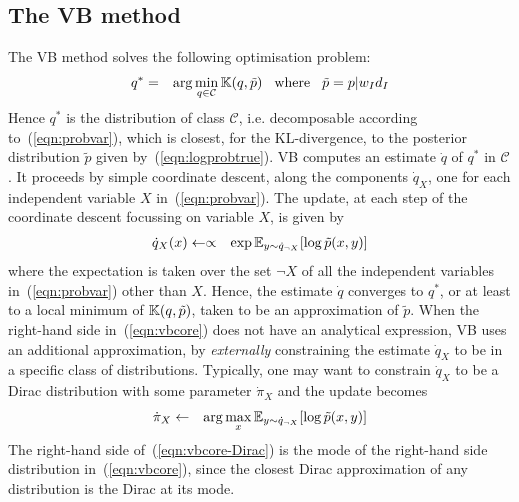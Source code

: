 \subsection{The VB method}
The VB method solves the following optimisation problem:
\begin{eqnarray}
\label{eqn:KLmin}
q^* & = & \arg\min_{q\in\mathcal{C}}\mathbb{K}(q,\tilde{p})
\hspace{.3cm}\textrm{where}\hspace{.3cm}\tilde{p}=p|w_Id_I
\end{eqnarray}
Hence $q^*$ is the distribution of class $\mathcal{C}$, i.e. decomposable according to~(\ref{eqn:probvar}), which is closest, for the KL-divergence, to the posterior distribution $\tilde{p}$ given by~(\ref{eqn:logprobtrue}). VB computes an estimate $\dot{q}$ of $q^*$ in $\mathcal{C}$. It proceeds by simple coordinate descent, along the components $\dot{q}_X$, one for each independent variable $X$ in~(\ref{eqn:probvar}). The update, at each step of the coordinate descent focussing on variable $X$, is given by
\begin{eqnarray}
\label{eqn:vbcore}
\dot{q}_X(x) &\leftarrow\propto& \exp\mathbb{E}_{y\sim \dot{q}_{\neg X}}[\log\tilde{p}(x,y)]
\end{eqnarray}
where the expectation is taken over the set $\neg X$ of all the independent variables in~(\ref{eqn:probvar}) other than $X$. Hence, the estimate $\dot{q}$ converges to $q^*$, or at least to a local minimum of $\mathbb{K}(q,\tilde{p})$, taken to be an approximation of $\tilde{p}$. When the right-hand side in~(\ref{eqn:vbcore}) does not have an analytical expression, VB uses an additional approximation, by {\em externally} constraining the estimate $\dot{q}_X$ to be in a specific class of distributions. Typically, one may want to constrain $\dot{q}_X$ to be a Dirac distribution with some parameter $\dot{\pi}_X$ and the update becomes
\begin{eqnarray}
\label{eqn:vbcore-Dirac}
\dot{\pi}_X &\leftarrow& \arg\max_x\mathbb{E}_{y\sim \dot{q}_{\neg X}}[\log\tilde{p}(x,y)]
\end{eqnarray}
The right-hand side of~(\ref{eqn:vbcore-Dirac}) is the mode of the right-hand side distribution in~(\ref{eqn:vbcore}), since the closest Dirac approximation of any distribution is the Dirac at its mode.

